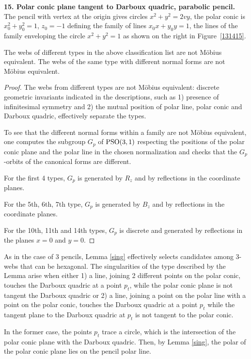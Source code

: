  {\bf 15. Polar conic plane tangent to Darboux quadric, parabolic pencil.}
 The pencil with vertex at the origin gives circles
$
x^2 + y^2=2vy$,
the polar conic is
$
x_0^2 + y_0^2 =1$, $ z_0=-1
$ defining the family of lines $x_0x + y_0y = 1$, the lines of the family enveloping the circle $ x^2 + y^2 = 1$ as shown on the right in Figure~\ref{131415}.

\begin{Theorem}
The webs of different types in the above classification list are not M\"obius equivalent. The webs of the same type with different normal forms are not M\"obius equivalent.
\end{Theorem}
\begin{proof} The webs from different types are not M\"obius equivalent: discrete geometric invariants indicated in the descriptions, such as 1) presence of infinitesimal symmetry and 2) the mutual position of polar line, polar conic and Darboux quadric, effectively separate the types.

To see that the different normal forms within a family are not M\"obius equivalent, one computes the subgroup $G_p$ of ${\rm PSO}(3,1)$ respecting the positions of the polar conic plane and the polar line in the chosen normalization and checks that the $G_p$-orbits of the canonical forms are different.

For the first 4 types, $G_p$ is generated by $R_z$ and by reflections in the coordinate planes.

For the 5th, 6th, 7th type, $G_p$ is generated by $B_z$ and by reflections in the coordinate planes.

For the 10th, 11th and 14th types, $G_p$ is discrete and generated by reflections in the planes $x=0$ and $y=0$.
\end{proof}


As in the case of 3 pencils, Lemma \ref{sing} effectively selects candidates among 3-webs that can be hexagonal. The singularities of the type described by the Lemma arise when either 1) a line, joining 2 different points on the polar conic, touches the Darboux quadric at a point $p_t$, while the polar conic plane is not tangent the Darboux quadric or 2) a line, joining a point on the polar line with a point on the polar conic, touches the Darboux quadric at a point $p_t$ while the tangent plane to the Darboux quadric at $p_t$ is not tangent to the polar conic.

In the former case, the points $p_t$ trace a circle, which is the intersection of the polar conic plane with the Darboux quadric. Then, by Lemma \ref{sing}, the polar of the polar conic plane lies on the pencil polar line.

